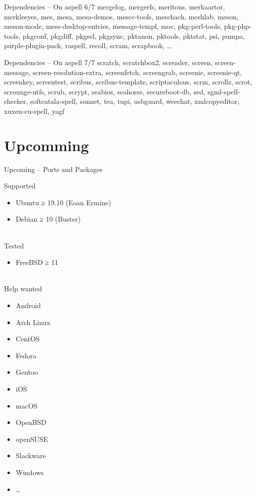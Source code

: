 \documentclass{beamer}
\begin{document}
\begin{frame}{Dependencies – On aspell 6/7}
mergelog, mergerfs, meritous, merkaartor, merkleeyes, mes, mesa, mesa-demos, mescc-tools, meschach, meshlab, meson, meson-mode, mess-desktop-entries, message-templ, moc, pkg-perl-tools, pkg-php-tools, pkgconf, pkgdiff, pkgsel, pkgsync, pktanon, pktools, pktstat, psi, pumpa, purple-plugin-pack, raspell, recoll, scram, scrapbook, …
\end{frame}

\begin{frame}{Dependencies – On aspell 7/7}
\tiny scratch, scratchbox2, screader, screen, screen-message, screen-resolution-extra, screenfetch, screengrab, screenie, screenie-qt, screenkey, screentest, scribus, scribus-template, scriptaculous, scrm, scrollz, scrot, scrounge-ntfs, scrub, scrypt, seabios, seahorse, secureboot-db, sed, \alert{sgml-spell-checker}, softcatala-spell, sonnet, tea, tupi, usbguard, weechat, \alert{xmlcopyeditor}, xuxen-eu-spell, yagf
\end{frame}



\section{Upcomming}

\begin{frame}{Upcoming – Ports and Packages}
\begin{multicols}{2}
Supported
\begin{itemize}
\item Ubuntu ≥ 19.10 (Eoan Ermine)
\item Debian ≥ 10 (Buster)
\end{itemize}
\mbox{}\\
Tested
\begin{itemize}
\item FreeBSD ≥ 11
\end{itemize}
\mbox{}\\
\alert{Help wanted}
\begin{itemize}
\item Android
\item Arch Linux
\item CentOS
\item Fedora
\item Gentoo
\item iOS
\item macOS
\item OpenBSD
\item openSUSE
\item Slackware
\item Windows
\item …
\end{itemize}
\end{multicols}
\end{frame}
\end{document}
